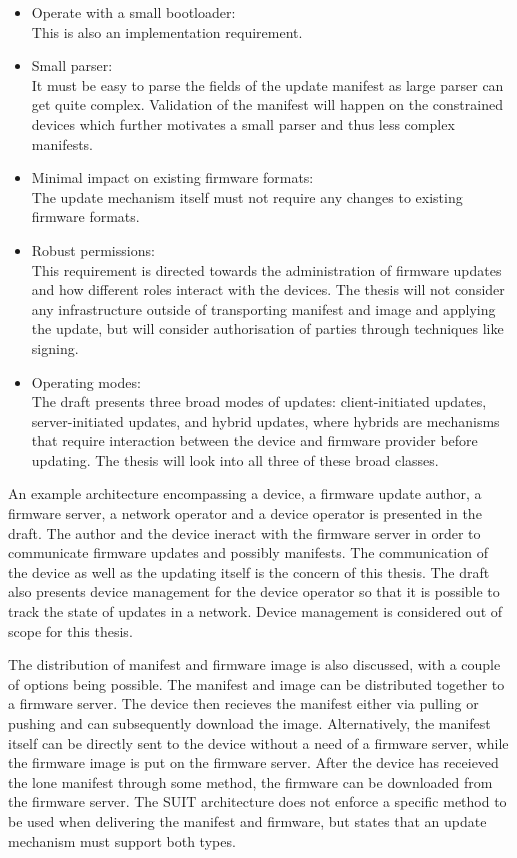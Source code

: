 \documentclass[0-thesis.tex]{subfiles}
\begin{document}
\begin{itemize}
    \item Operate with a small bootloader:\\
            This is also an implementation requirement. %
    \item Small parser:\\
            It must be easy to parse the fields of the update manifest as large parser can
            get quite complex. Validation of the manifest will happen on the constrained
            devices which further motivates a small parser and thus less complex
            manifests.
    \item Minimal impact on existing firmware formats:\\
            The update mechanism itself must not require any changes to existing firmware
            formats. %
    \item Robust permissions:\\
            This requirement is directed towards the administration of firmware updates
            and how different roles interact with the devices. The thesis will not
            consider any infrastructure outside of transporting manifest and image and
            applying the update, but will consider authorisation of parties through
            techniques like signing.
    \item Operating modes:\\
            The draft presents three broad modes of updates: client-initiated updates,
            server-initiated updates, and hybrid updates, where hybrids are mechanisms
            that require interaction between the device and firmware provider before
            updating. The thesis will look into all three of these broad classes.
\end{itemize}

An example architecture encompassing a device, a firmware update author, a firmware
server, a network operator and a device operator is presented in the draft. The author and
the device ineract with the firmware server in order to communicate firmware updates and
possibly manifests. The communication of the device as well as the updating itself is the
concern of this thesis. The draft also presents device management for the device operator
so that it is possible to track the state of updates in a network. Device management is
considered out of scope for this thesis.

The distribution of manifest and firmware image is also discussed, with a couple of
options being possible. The manifest and image can be distributed together to a firmware
server. The device then recieves the manifest either via pulling or pushing and can
subsequently download the image. Alternatively, the manifest itself can be directly sent
to the device without a need of a firmware server, while the firmware image is put on the
firmware server. After the device has receieved the lone manifest through some method, the
firmware can be downloaded from the firmware server. The SUIT architecture does not
enforce a specific method to be used when delivering the manifest and firmware, but states
that an update mechanism must support both types.
\end{document}
